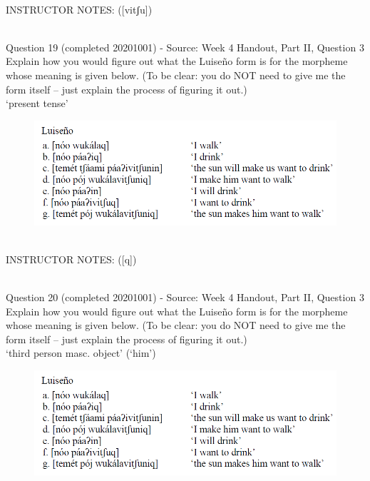 \documentclass[12pt]{article}
\begin{document}
~\\
INSTRUCTOR NOTES: ([vitʃu])


~\\

{\large Question 19} (completed 20201001) - Source: Week 4 Handout, Part II, Question 3\\

Explain how you would figure out what the Luiseño form is for the morpheme whose meaning is given below. (To be clear: you do NOT need to give me the form itself -- just explain the process of figuring it out.)\\

‘present tense’

\begin{figure}[H]
\includegraphics{../images/luiseno.png}
\end{figure}

~\\
INSTRUCTOR NOTES: ([q])


~\\

{\large Question 20} (completed 20201001) - Source: Week 4 Handout, Part II, Question 3\\

Explain how you would figure out what the Luiseño form is for the morpheme whose meaning is given below. (To be clear: you do NOT need to give me the form itself -- just explain the process of figuring it out.)\\

‘third person masc. object’ (‘him’)

\begin{figure}[H]
\includegraphics{../images/luiseno.png}
\end{figure}
\end{document}
